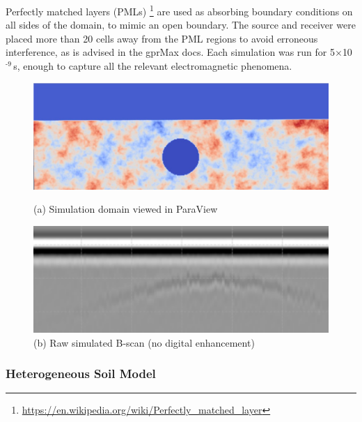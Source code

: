             \noindent Perfectly matched layers (PMLs) \footnote{\url{https://en.wikipedia.org/wiki/Perfectly_matched_layer}} are used as absorbing boundary conditions on all sides of the domain, to mimic an open boundary. The source and receiver were placed more than 20 cells away from the PML regions to avoid erroneous interference, as is advised in the gprMax docs. Each simulation was run for 5$\times$10$^{\text{-9}}$\,s, enough to capture all the relevant electromagnetic phenomena.
            \begin{figure}[htbp]
            \centering
            \begin{minipage}[b]{0.48\textwidth}
                \centering
                \includegraphics[width=\textwidth]{figs/Rory/radar_domain.pdf}
                \caption{(a) Simulation domain viewed in ParaView }
                \label{fig:radar_domain}
            \end{minipage}
            \hfill
            \begin{minipage}[b]{0.48\textwidth}
                \centering
                \includegraphics[width=\textwidth]{figs/Rory/sim_bscan_cropped.png}
                \caption{(b) Raw simulated B-scan (no digital enhancement)}
                \label{fig:original_bscan}
            \end{minipage}
        \end{figure}    
    \subsubsection{Heterogeneous Soil Model}
    
